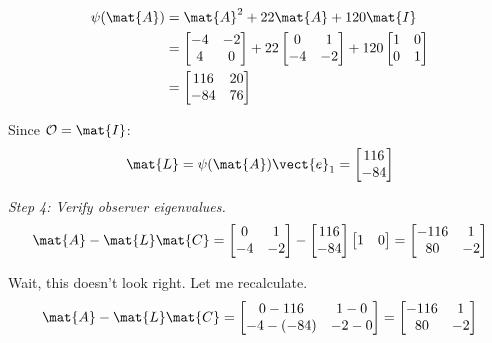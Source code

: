\begin{align}
\psi(\mat{A}) &= \mat{A}^2 + 22\mat{A} + 120\mat{I} \nonumber \\
&= \begin{bmatrix} -4 & -2 \\ 4 & 0 \end{bmatrix} +
22\begin{bmatrix} 0 & 1 \\ -4 & -2 \end{bmatrix} +
120\begin{bmatrix} 1 & 0 \\ 0 & 1 \end{bmatrix} \nonumber \\
&= \begin{bmatrix} 116 & 20 \\ -84 & 76 \end{bmatrix}
\end{align}

Since $\mathcal{O} = \mat{I}$:
\begin{equation}
\mat{L} = \psi(\mat{A})\vect{e}_1 = \begin{bmatrix} 116 \\ -84 \end{bmatrix}
\end{equation}

\textit{Step 4: Verify observer eigenvalues.}
\begin{equation}
\mat{A} - \mat{L}\mat{C} = \begin{bmatrix} 0 & 1 \\ -4 & -2 \end{bmatrix} -
\begin{bmatrix} 116 \\ -84 \end{bmatrix}\begin{bmatrix} 1 & 0 \end{bmatrix}
= \begin{bmatrix} -116 & 1 \\ 80 & -2 \end{bmatrix}
\end{equation}

Wait, this doesn't look right. Let me recalculate.
\begin{equation}
\mat{A} - \mat{L}\mat{C} = \begin{bmatrix} 0-116 & 1-0 \\ -4-(-84) & -2-0 \end{bmatrix}
= \begin{bmatrix} -116 & 1 \\ 80 & -2 \end{bmatrix}
\end{equation}

